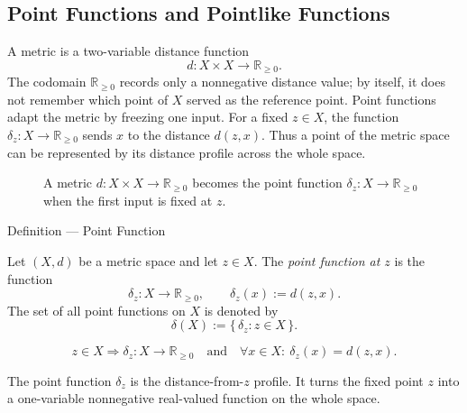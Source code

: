 \subsection{Point Functions and Pointlike Functions}

\begin{remark*}[Exposition]
A metric is a two-variable distance function
\[
  d:X\times X\to\mathbb{R}_{\geq 0}.
\]
The codomain \(\mathbb{R}_{\geq 0}\) records only a nonnegative distance
value; by itself, it does not remember which point of \(X\) served as the
reference point.  Point functions adapt the metric by freezing one input.
For a fixed \(z\in X\), the function \(\delta_z:X\to\mathbb{R}_{\geq 0}\)
sends \(x\) to the distance \(d(z,x)\).  Thus a point of the metric space can
be represented by its distance profile across the whole space.
\end{remark*}

\begin{figure}[htbp]
\centering

\caption{A metric \(d:X\times X\to\mathbb{R}_{\geq 0}\) becomes the point
function \(\delta_z:X\to\mathbb{R}_{\geq 0}\) when the first input is fixed at
\(z\).}
\label{fig:point-function-freezes-metric}
\end{figure}

\begin{definitionbox}{Definition --- Point Function}
\begin{definition}\label{def:metric-point-function}
Let \((X,d)\) be a metric space and let \(z\in X\).  The
\emph{point function at \(z\)} is the function
\[
  \delta_z:X\to\mathbb{R}_{\geq 0},
  \qquad
  \delta_z(x):=d(z,x).
\]
The set of all point functions on \(X\) is denoted by
\[
  \delta(X):=\{\,\delta_z:z\in X\,\}.
\]
\end{definition}
\end{definitionbox}

\begin{remark*}
\[
z\in X
\Longrightarrow
\delta_z:X\to\mathbb{R}_{\geq 0}
\quad\text{and}\quad
\forall x\in X{:}\ \delta_z(x)=d(z,x).
\]
\end{remark*}

\begin{remark*}[Interpretation]
The point function \(\delta_z\) is the distance-from-\(z\) profile.  It turns
the fixed point \(z\) into a one-variable nonnegative real-valued function on
the whole space.
\end{remark*}

